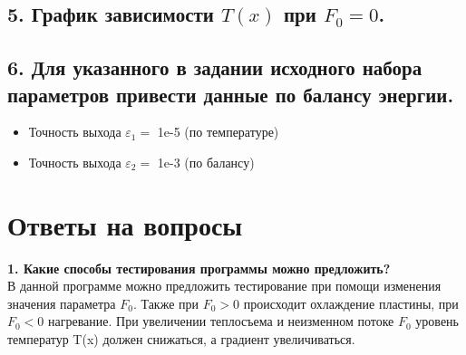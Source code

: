 \documentclass[a4paper,oneside,12pt]{extreport}
\begin{document}

\newpage

\subsection{5. График зависимости $T(x)$ при $F_{0} = 0$.}

\begin{figure}[ht!]
\end{figure}

\subsection{6. Для указанного в задании исходного набора параметров привести данные по балансу энергии.}

\begin{itemize}
	\item Точность выхода $\varepsilon_{1} = $ 1e-5 (по температуре)
	\item Точность выхода $\varepsilon_{2} = $ 1e-3 (по балансу)
\end{itemize}


\newpage
\section{Ответы на вопросы}

\textbf{1. Какие способы тестирования программы можно предложить?}\\

В данной программе можно предложить тестирование при помощи изменения значения параметра 
$F_0$. Также при $F_0 > 0$ происходит охлаждение пластины, при $F_0 < 0$ нагревание. При увеличении теплосъема и неизменном потоке
$F_0$ уровень температур T(x) должен снижаться, а градиент увеличиваться.
\end{document}
